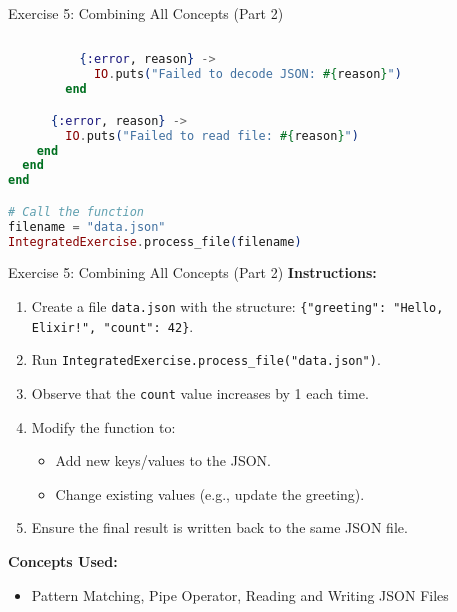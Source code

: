 \documentclass[aspectratio=169, table]{beamer}
\begin{document}
\begin{frame}[fragile]{Exercise 5: Combining All Concepts (Part 2)}
\vspace{20pt}
\begin{lstlisting}[language=Elixir, basicstyle=\ttfamily\footnotesize]
            
          {:error, reason} ->
            IO.puts("Failed to decode JSON: #{reason}")
        end

      {:error, reason} ->
        IO.puts("Failed to read file: #{reason}")
    end
  end
end

# Call the function
filename = "data.json"
IntegratedExercise.process_file(filename)
\end{lstlisting}
\end{frame}



\begin{frame}{Exercise 5: Combining All Concepts (Part 2)}
\vspace{20pt}
\textbf{Instructions:}
\begin{enumerate}
  \item Create a file \texttt{data.json} with the structure:  
  \texttt{\{"greeting": "Hello, Elixir!", "count": 42\}}.
  \item Run \texttt{IntegratedExercise.process\_file("data.json")}.
  \item Observe that the \texttt{count} value increases by 1 each time.
  \item Modify the function to:
  \begin{itemize}
    \item Add new keys/values to the JSON.
    \item Change existing values (e.g., update the greeting).
  \end{itemize}
  \item Ensure the final result is written back to the same JSON file.
\end{enumerate}

\textbf{Concepts Used:}
\begin{itemize}
  \item Pattern Matching, Pipe Operator, Reading and Writing JSON Files
\end{itemize}
\end{frame}
\end{document}
